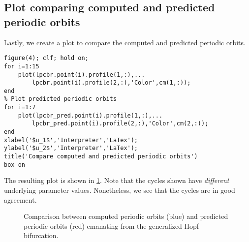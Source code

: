 \subsection{Plot comparing computed and predicted periodic orbits}
Lastly, we create a plot to compare the computed and predicted periodic orbits.
\begin{lstlisting}[style=customMatlab]
%% Plot comparing computed and predicted periodic orbits
figure(4); clf; hold on;
for i=1:15
    plot(lpcbr.point(i).profile(1,:),...
        lpcbr.point(i).profile(2,:),'Color',cm(1,:));
end
% Plot predicted periodic orbits
for i=1:7
    plot(lpcbr_pred.point(i).profile(1,:),...
        lpcbr_pred.point(i).profile(2,:),'Color',cm(2,:));
end
xlabel('$u_1$','Interpreter','LaTex');
ylabel('$u_2$','Interpreter','LaTex');
title('Compare computed and predicted periodic orbits')
box on
\end{lstlisting}
The resulting plot is shown in \cref{switch:sm:fig:FHN:compare_orbits}. Note that the cycles shown have \emph{different} underlying parameter values. Nonetheless, we see that the cycles are in good agreement.

\begin{figure}
	\centering
	\caption{Comparison between computed periodic orbits (blue) and predicted periodic orbits (red) emanating from the generalized Hopf bifurcation.}
	\label{switch:sm:fig:FHN:compare_orbits}
\end{figure}


